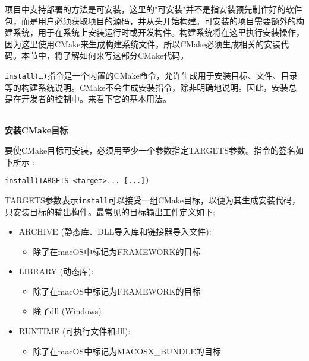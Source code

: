项目中支持部署的方法是可安装，这里的"可安装"并不是指安装预先制作好的软件包，而是用户必须获取项目的源码，并从头开始构建。可安装的项目需要额外的构建系统，用于在系统上安装运行时或开发构件。构建系统将在这里执行安装操作，因为这里使用CMake来生成构建系统文件，所以CMake必须生成相关的安装代码。本节中，将了解如何来写这部分CMake代码。


\texttt{install(…)}指令是一个内置的CMake命令，允许生成用于安装目标、文件、目录等的构建系统说明。CMake不会生成安装指令，除非明确地说明。因此，安装总是在开发者的控制中。来看下它的基本用法。

\hspace*{\fill} \\ %
\noindent
\textbf{安装CMake目标}

要使CMake目标可安装，必须用至少一个参数指定TARGETS参数。指令的签名如下所示
:

\begin{lstlisting}[style=styleCMake]
install(TARGETS <target>... [...])
\end{lstlisting}

TARGETS参数表示\texttt{install}可以接受一组CMake目标，以便为其生成安装代码，只安装目标的输出构件。最常见的目标输出工件定义如下:

\begin{itemize}
\item 
ARCHIVE (静态库、DLL导入库和链接器导入文件):

\begin{itemize}
\item 
除了在macOS中标记为FRAMEWORK的目标
\end{itemize}

\item 
LIBRARY (动态库):

\begin{itemize}
\item 
除了在macOS中标记为FRAMEWORK的目标

\item 
除了dll (Windows)
\end{itemize}

\item 
RUNTIME (可执行文件和dll):

\begin{itemize}
\item 
除了在macOS中标记为MACOSX\_BUNDLE的目标
\end{itemize}
\end{itemize}

